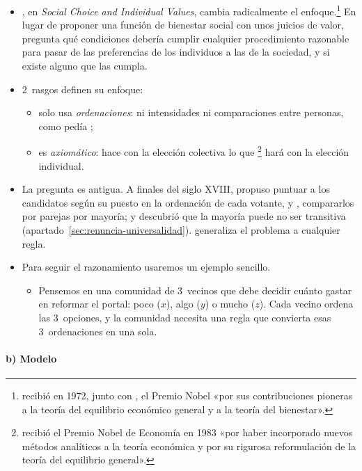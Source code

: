 \documentclass[11pt]{article}
\begin{document}
\begin{itemize}
\item {}, en \emph{Social Choice and Individual Values}\nocite{Arrow1951Social}, cambia radicalmente el enfoque.\footnote{ recibió en 1972, junto con , el Premio Nobel «por sus contribuciones pioneras a la teoría del equilibrio económico general y a la teoría del bienestar»\nocite{Nobel1972HicksArrow}.} En lugar de proponer una función de bienestar social con unos juicios de valor, pregunta qué condiciones debería cumplir cualquier procedimiento razonable para pasar de las preferencias de los individuos a las de la sociedad, y si existe alguno que las cumpla.
\item 2~rasgos definen su enfoque:
  \begin{itemize}
  \item solo usa \emph{ordenaciones}: ni intensidades ni comparaciones entre personas, como pedía ;
  \item es \emph{axiomático}: hace con la elección colectiva lo que \textcite{Debreu1959Theory}\footnote{ recibió el Premio Nobel de Economía en 1983 «por haber incorporado nuevos métodos analíticos a la teoría económica y por su rigurosa reformulación de la teoría del equilibrio general»\nocite{Nobel1983Debreu}.} hará con la elección individual.
  \end{itemize}
\item La pregunta es antigua. A finales del siglo XVIII,  propuso puntuar a los candidatos según su puesto en la ordenación de cada votante, y \textcite{Condorcet1785Essai}, compararlos por parejas por mayoría; y  descubrió que la mayoría puede no ser transitiva (apartado~\ref{sec:renuncia-universalidad}).  generaliza el problema a cualquier regla.
\item Para seguir el razonamiento usaremos un ejemplo sencillo.
  \begin{itemize}
  \item Pensemos en una comunidad de 3~vecinos que debe decidir cuánto gastar en reformar el portal: poco ($x$), algo ($y$) o mucho ($z$). Cada vecino ordena las 3~opciones, y la comunidad necesita una regla que convierta esas 3~ordenaciones en una sola.
  \end{itemize}
\end{itemize}

\paragraph{b) Modelo}
\end{document}
